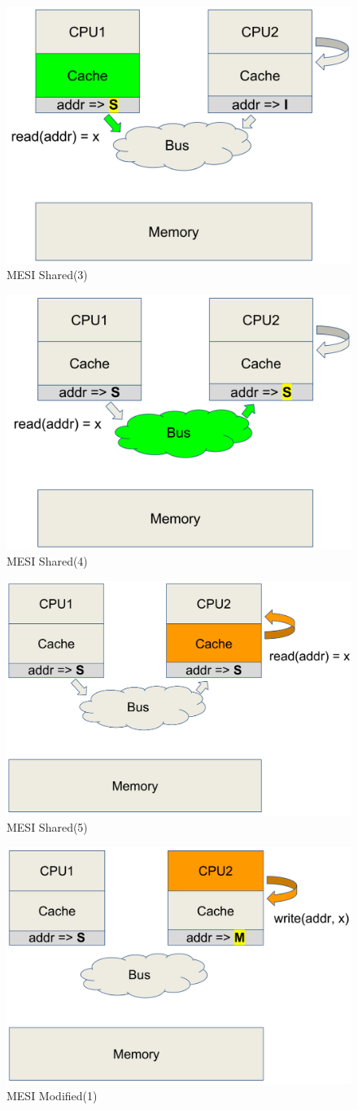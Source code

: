 \documentclass[10pt,a4paper,oneside,titlepage]{article}
\theoremstyle{plain}
\theoremstyle{defenition}
\begin{document}
\begin{figure}[h!]
	\centering
	\includegraphics[width=0.4\linewidth]{pictures/MESI9}
	\caption{MESI Shared(3)}
	\label{fig:mesi9}
\end{figure}

\begin{figure}[h!]
	\centering
	\includegraphics[width=0.4\linewidth]{pictures/MESI10}
	\caption{MESI Shared(4)}
	\label{fig:mesi10}
\end{figure}

\begin{figure}[h!]
	\centering
	\includegraphics[width=0.4\linewidth]{pictures/MESI11}
	\caption{MESI Shared(5)}
	\label{fig:mesi11}
\end{figure}

\begin{figure}[h!]
	\centering
	\includegraphics[width=0.4\linewidth]{pictures/MESI12}
	\caption{MESI Modified(1)}
	\label{fig:mesi12}
\end{figure}
\end{document}
